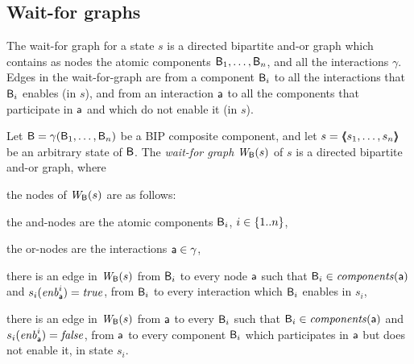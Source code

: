 %


\subsection{Wait-for graphs}
\label{secn:wait-for-graphs}

The wait-for graph for a state $s$ is a directed bipartite and-or graph which contains as nodes the atomic components $\mathsf{B}_1, \ldots, \mathsf{B}_n$, and all
the interactions $\gamma$.  Edges in the wait-for-graph are from a component $\mathsf{B}_i$ to all the interactions that $\mathsf{B}_i$ enables (in $s$), and from an
interaction $\mathsf{a}$ to all the components that participate in $\mathsf{a}$ and which do not enable it (in $s$).


\begin{definition}
\label{def:static:wait-for-graph} 
\label{defn:static:wait-for-graph} 
Let $\mathsf{B} = \gamma(\mathsf{B}_1,\dots,\mathsf{B}_n)$ be a BIP composite component, and let
$s = \langle \hspace{-0.34em} \langle \hspace{-0.34em} \langle s_1,\ldots,s_n \rangle \hspace{-0.34em} \rangle \hspace{-0.34em} \rangle$ be an arbitrary state of $\mathsf{B}$.
The {\em wait-for graph} $\mathit{W}_{\mathsf{B}}({s})$ of $s$ is a directed bipartite and-or graph, where
\begin{nlst1}

\item \label{def:static:wait-for-graph:nodes} the nodes of $\mathit{W}_{\mathsf{B}}({s})$ are as follows:
%
   \begin{nlst2}
   \item the and-nodes are the atomic components $\mathsf{B}_i$, $i \in \{ 1..n \}$,
   \item the or-nodes are the interactions $\mathsf{a} \in \gamma$,
   \end{nlst2}

\item \label{def:static:wait-for-graph:edges-aut-action} 
   there is an edge in $\mathit{W}_{\mathsf{B}}({s})$ from $\mathsf{B}_i$ to every node 
   $\mathsf{a}$ such that $\mathsf{B}_i \in \mathit{components}(\mathsf{a})$ and $s_i(\mathit{enb}_{\mathsf{a}}^{i}) = \mathit{true}$, \ie from $\mathsf{B}_i$ to every interaction
   which $\mathsf{B}_i$ enables in $s_i$,

\item  \label{def:static:wait-for-graph:edges-action-aut}
   there is an edge in $\mathit{W}_{\mathsf{B}}({s})$ from $\mathsf{a}$ to every 
   $\mathsf{B}_i$ such that $\mathsf{B}_i \in \mathit{components}(\mathsf{a})$ and $s_i(\mathit{enb}_{\mathsf{a}}^{i}) = \mathit{false}$, \ie from $\mathsf{a}$ to every component
   $\mathsf{B}_i$ which participates in $\mathsf{a}$ but does not enable it, in state $s_i$.
                  
\end{nlst1}
\end{definition}

